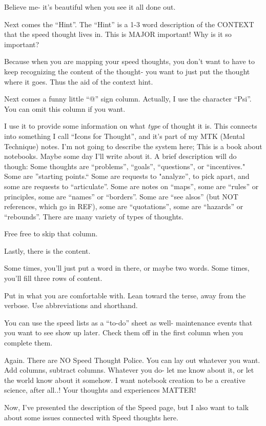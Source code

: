 \documentclass[oneside]{book}
\begin{document}
Believe me- it's beautiful when you see it all done out.

Next comes the ``Hint''. The ``Hint'' is a 1-3 word description of the
CONTEXT that the speed thought lives in. This is MAJOR important! Why
is it so important?

Because when you are mapping your speed thoughts, you don't want to
have to keep recognizing the content of the thought- you want to just
put the thought where it goes. Thus the aid of the context hint.

Next comes a funny little ``@'' sign column. Actually, I use the
character ``Psi''. You can omit this column if you want.

I use it to provide some information on what \emph{type} of thought it
is. This connects into something I call ``Icons for Thought'', and it's
part of my MTK (Mental Technique) notes. I'm not going to describe the
system here; This is a book about notebooks. Maybe some day I'll write
about it. A brief description will do though: Some thoughts are
``problems'', ``goals'', ``questions'', or ``incentives." Some are ''starting
points.`` Some are requests to "analyze'', to pick apart, and some are
requests to ``articulate''. Some are notes on ``maps'', some are ``rules''
or principles, some are ``names'' or ``borders''. Some are ``see alsos''
(but NOT references, which go in REF), some are ``quotations'', some are
``hazards'' or ``rebounds''. There are many variety of types of thoughts.

Free free to skip that column.

Lastly, there is the content.

Some times, you'll just put a word in there, or maybe two words. Some
times, you'll fill three rows of content.

Put in what you are comfortable with. Lean toward the terse, away from
the verbose. Use abbreviations and shorthand.

You can use the speed lists as a ``to-do'' sheet as well- maintenance
events that you want to see show up later. Check them off in the first
column when you complete them.

Again. There are NO Speed Thought Police. You can lay out whatever you
want. Add columns, subtract columns. Whatever you do- let me know about
it, or let the world know about it somehow. I want notebook creation
to be a creative science, after all..! Your thoughts and experiences
MATTER!


Now, I've presented the description of the Speed page, but I also want
to talk about some issues connected with Speed thoughts here.
\end{document}
